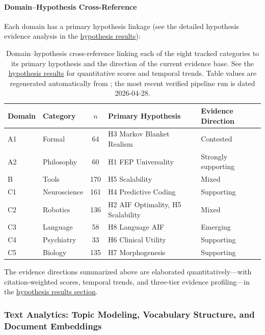 \documentclass[
  english,
]{article}
\begin{document}
{{{{{{{{{{{{{{{{\paragraph{Domain--Hypothesis
Cross-Reference}\label{domainhypothesis-cross-reference}

Each domain has a primary hypothesis linkage (see the detailed
hypothesis evidence analysis in the
\hyperref[sec:hypothesis_results]{hypothesis results}):

\begin{table}[htbp]
\centering
\caption[Domain--hypothesis cross-reference]{Domain--hypothesis cross-reference linking each of the eight tracked categories to its primary hypothesis and the direction of the current evidence base. See the \hyperref[sec:hypothesis_results]{hypothesis results} for quantitative scores and temporal trends. Table values are regenerated automatically from ; the most recent verified pipeline run is dated 2026-04-28.}
\label{tab:domain_hypothesis_crossref}
\begin{tabular}{llcll}
\toprule
\textbf{Domain} & \textbf{Category} & $n$ & \textbf{Primary Hypothesis} & \textbf{Evidence Direction} \\
\midrule
A1 & Formal & 64 & H3 Markov Blanket Realism & Contested \\
A2 & Philosophy & 60 & H1 FEP Universality & Strongly supporting \\
B & Tools & 170 & H5 Scalability & Mixed \\
C1 & Neuroscience & 161 & H4 Predictive Coding & Supporting \\
C2 & Robotics & 136 & H2 AIF Optimality, H5 Scalability & Mixed \\
C3 & Language & 58 & H8 Language AIF & Emerging \\
C4 & Psychiatry & 33 & H6 Clinical Utility & Supporting \\
C5 & Biology & 135 & H7 Morphogenesis & Supporting \\
\bottomrule
\end{tabular}
\end{table}

The evidence directions summarized above are elaborated
quantitatively---with citation-weighted scores, temporal trends, and
three-tier evidence profiling---in the
\hyperref[sec:hypothesis_results]{hypothesis results section}.

\newpage

\subsubsection{\texorpdfstring{Text Analytics: Topic Modeling,
Vocabulary Structure, and Document Embeddings
\label{sec:text_analytics}}{Text Analytics: Topic Modeling, Vocabulary Structure, and Document Embeddings}}\label{text-analytics-topic-modeling-vocabulary-structure-and-document-embeddings}

}}}}}}}}}}}}}}}}
\end{document}
